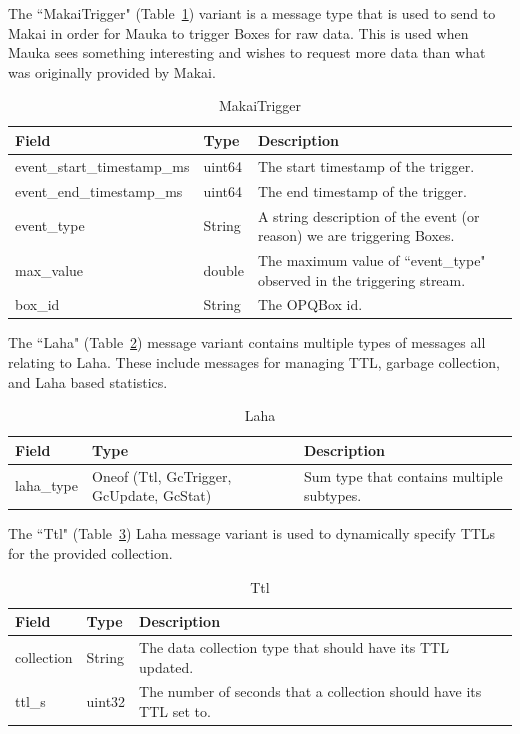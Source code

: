 The ``MakaiTrigger" (Table~\ref{table:MakaiTrigger}) variant is a message type that is used to send to Makai in order for Mauka to trigger Boxes for raw data. This is used when Mauka sees something interesting and wishes to request more data than what was originally provided by Makai.

\begin{table}[H]
	\centering
	\caption{MakaiTrigger}
	\begin{tabularx}{\textwidth}{llX}
		\toprule
		\textbf{Field} & \textbf{Type} & \textbf{Description} \\
		\midrule
		event\_start\_timestamp\_ms & uint64  & The start timestamp of the trigger. \\
		event\_end\_timestamp\_ms & uint64 & The end timestamp of the trigger. \\
		event\_type & String & A string description of the event (or reason) we are triggering Boxes. \\
		max\_value & double & The maximum value of ``event\_type" observed in the triggering stream. \\
		box\_id & String & The OPQBox id. \\
		\bottomrule
	\end{tabularx}
	\label{table:MakaiTrigger}
\end{table}

The ``Laha" (Table~\ref{table:Laha}) message variant contains multiple types of messages all relating to Laha. These include messages for managing TTL, garbage collection, and Laha based statistics.

\begin{table}[H]
	\centering
	\caption{Laha}
	\begin{tabularx}{\textwidth}{lXX}
		\toprule
		\textbf{Field} & \textbf{Type} & \textbf{Description} \\
		\midrule
		laha\_type & Oneof (Ttl, GcTrigger, GcUpdate, GcStat) & Sum type that contains multiple subtypes. \\
		\bottomrule
	\end{tabularx}
	\label{table:Laha}
\end{table}

The ``Ttl" (Table~\ref{table:Ttl}) Laha message variant is used to dynamically specify TTLs for the provided collection.

\begin{table}[H]
	\centering
	\caption{Ttl}
	\begin{tabularx}{\textwidth}{llX}
		\toprule
		\textbf{Field} & \textbf{Type} & \textbf{Description} \\
		\midrule
		collection & String & The data collection type that should have its TTL updated.  \\
		ttl\_s & uint32 & The number of seconds that a collection should have its TTL set to. \\
		\bottomrule
	\end{tabularx}
	\label{table:Ttl}
\end{table}

